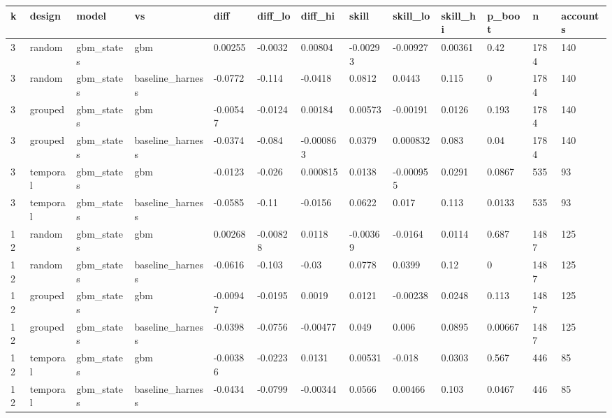 \begin{tabular}{lllllllllllll}
\toprule
k & design & model & vs & diff & diff\_lo & diff\_hi & skill & skill\_lo & skill\_hi & p\_boot & n & accounts \\
\midrule
3 & random & gbm\_states & gbm & 0.00255 & -0.0032 & 0.00804 & -0.00293 & -0.00927 & 0.00361 & 0.42 & 1784 & 140 \\
3 & random & gbm\_states & baseline\_harness & -0.0772 & -0.114 & -0.0418 & 0.0812 & 0.0443 & 0.115 & 0 & 1784 & 140 \\
3 & grouped & gbm\_states & gbm & -0.00547 & -0.0124 & 0.00184 & 0.00573 & -0.00191 & 0.0126 & 0.193 & 1784 & 140 \\
3 & grouped & gbm\_states & baseline\_harness & -0.0374 & -0.084 & -0.000863 & 0.0379 & 0.000832 & 0.083 & 0.04 & 1784 & 140 \\
3 & temporal & gbm\_states & gbm & -0.0123 & -0.026 & 0.000815 & 0.0138 & -0.000955 & 0.0291 & 0.0867 & 535 & 93 \\
3 & temporal & gbm\_states & baseline\_harness & -0.0585 & -0.11 & -0.0156 & 0.0622 & 0.017 & 0.113 & 0.0133 & 535 & 93 \\
12 & random & gbm\_states & gbm & 0.00268 & -0.00828 & 0.0118 & -0.00369 & -0.0164 & 0.0114 & 0.687 & 1487 & 125 \\
12 & random & gbm\_states & baseline\_harness & -0.0616 & -0.103 & -0.03 & 0.0778 & 0.0399 & 0.12 & 0 & 1487 & 125 \\
12 & grouped & gbm\_states & gbm & -0.00947 & -0.0195 & 0.0019 & 0.0121 & -0.00238 & 0.0248 & 0.113 & 1487 & 125 \\
12 & grouped & gbm\_states & baseline\_harness & -0.0398 & -0.0756 & -0.00477 & 0.049 & 0.006 & 0.0895 & 0.00667 & 1487 & 125 \\
12 & temporal & gbm\_states & gbm & -0.00386 & -0.0223 & 0.0131 & 0.00531 & -0.018 & 0.0303 & 0.567 & 446 & 85 \\
12 & temporal & gbm\_states & baseline\_harness & -0.0434 & -0.0799 & -0.00344 & 0.0566 & 0.00466 & 0.103 & 0.0467 & 446 & 85 \\
\bottomrule
\end{tabular}